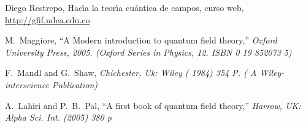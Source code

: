 \begin{thebibliography}{99}
 Diego Restrepo, Hac\'\i a la teor\'\i a cu\'antica de campos, curso web, \url{http://gfif.udea.edu.co}

  M.~Maggiore,
  ``A Modern introduction to quantum field theory,''
{\it  Oxford University Press, 2005. (Oxford Series in Physics, 12. ISBN 0 19 852073 5)}

  F.~Mandl and G.~Shaw,
{\it  Chichester, Uk: Wiley ( 1984) 354 P. ( A Wiley-interscience Publication)}

  A.~Lahiri and P.~B.~Pal,
  ``A first book of quantum field theory,''
{\it  Harrow, UK: Alpha Sci. Int. (2005) 380 p}


\end{thebibliography}
